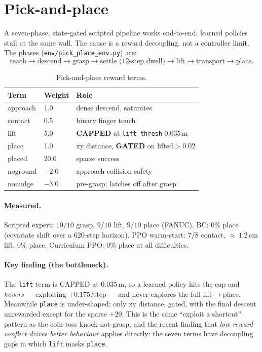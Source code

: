 \documentclass[11pt]{article}
\begin{document}
\section{Pick-and-place}

A seven-phase, state-gated scripted pipeline works end-to-end; learned policies
stall at the same wall. The cause is a reward decoupling, not a controller limit.
The phases (\texttt{env/pick\_place\_env.py}) are:
\[
\text{reach} \rightarrow \text{descend} \rightarrow \text{grasp}
\rightarrow \text{settle (12-step dwell)} \rightarrow \text{lift}
\rightarrow \text{transport} \rightarrow \text{place}.
\]

\begin{table}[h]
\centering
\begin{tabular}{@{}llp{7.2cm}@{}}
\toprule
\textbf{Term} & \textbf{Weight} & \textbf{Role} \\
\midrule
approach & 1.0 & dense descend, saturates \\
contact & 0.5 & binary finger touch \\
lift & 5.0 & \textbf{CAPPED} at \texttt{lift\_thresh} $0.035$\,m \\
place & 1.0 & xy distance, \textbf{GATED} on $\text{lifted}>0.02$ \\
placed & 20.0 & sparse success \\
noground & $-2.0$ & approach-collision safety \\
nonudge & $-3.0$ & pre-grasp; latches off after grasp \\
\bottomrule
\end{tabular}
\caption{Pick-and-place reward terms.}
\end{table}

\paragraph{Measured.} Scripted expert: $10/10$ grasp, $9/10$ lift, $9/10$ place
(FANUC). BC: $0\%$ place (covariate shift over a 620-step horizon). PPO
warm-start: $7/8$ contact, $\approx$\,$1.2$\,cm lift, $0\%$ place. Curriculum PPO:
$0\%$ place at all difficulties.

\paragraph{Key finding (the bottleneck).} The \texttt{lift} term is CAPPED at
$0.035$\,m, so a learned policy hits the cap and \emph{hovers} --- exploiting
$+0.175$/step --- and never explores the full lift$\rightarrow$place. Meanwhile
\texttt{place} is under-shaped: only xy distance, gated, with the final descent
unrewarded except for the sparse $+20$. This is the same ``exploit a shortcut''
pattern as the coin-toss knock-not-grasp, and the recent finding that \emph{low
reward-conflict drives better behaviour} applies directly: the seven terms have
decoupling gaps in which \texttt{lift} masks \texttt{place}.
\end{document}
